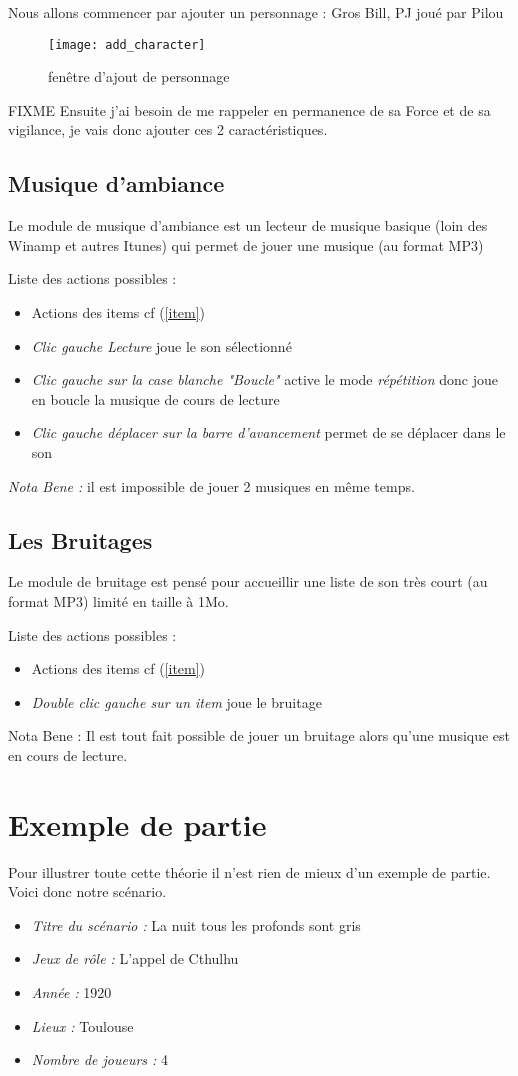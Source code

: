 \documentclass[12pt]{article}
\begin{document}
Nous allons commencer par ajouter un personnage : Gros Bill, PJ joué par Pilou
\begin{figure}[h]
    \texttt{[image: add\_character]}
    \caption{fenêtre d'ajout de personnage}
\end{figure}
FIXME Ensuite j'ai besoin de me rappeler en permanence de sa Force et de sa vigilance, je vais donc ajouter ces 2 caractéristiques.

\subsection{Musique d'ambiance}\label{musique}
Le module de musique d'ambiance est un lecteur de musique basique (loin des Winamp et autres Itunes) qui permet de jouer une musique (au format MP3)

Liste des actions possibles :
\begin{itemize}
    \item Actions des items cf (\ref{item})
    \item \emph{Clic gauche Lecture} joue le son sélectionné
    \item \emph{Clic gauche sur la case blanche "Boucle"} active le mode \emph{répétition} donc joue en boucle la musique de cours de lecture
    \item \emph{Clic gauche déplacer sur la barre d'avancement} permet de se déplacer dans le son
\end{itemize}
\emph{Nota Bene :} il est impossible de jouer 2 musiques en même temps.

\subsection{Les Bruitages}\label{bruitage}
Le module de bruitage est pensé pour accueillir une liste de son très court (au format MP3) limité en taille à 1Mo.

Liste des actions possibles :
\begin{itemize}
    \item Actions des items cf (\ref{item})
    \item \emph{Double clic gauche sur un item} joue le bruitage
\end{itemize}

Nota Bene : Il est tout fait possible de jouer un bruitage alors qu'une musique est en cours de lecture.

\section{Exemple de partie}\label{exemple}
Pour illustrer toute cette théorie il n'est rien de mieux d'un exemple de partie.
Voici donc notre scénario.
\begin{itemize}
    \item \emph{Titre du scénario :} La nuit tous les profonds sont gris
    \item \emph{Jeux de rôle :} L'appel de Cthulhu
    \item \emph{Année :} 1920
    \item \emph{Lieux :} Toulouse
    \item \emph{Nombre de joueurs : } 4
\end{itemize}
\end{document}
